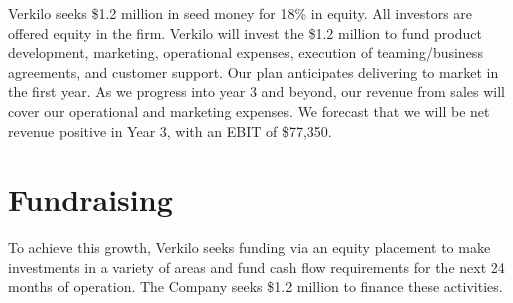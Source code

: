 \documentclass[10pt,openany]{book}
\begin{document}
Verkilo seeks \$1.2 million in seed money for 18\% in equity. All
investors are offered equity in the firm. Verkilo will invest the \$1.2
million to fund product development, marketing, operational expenses,
execution of teaming/business agreements, and customer support. Our plan
anticipates delivering to market in the first year. As we progress into
year 3 and beyond, our revenue from sales will cover our operational and
marketing expenses. We forecast that we will be net revenue positive in
Year 3, with an EBIT of \$77,350.

\hypertarget{fundraising}{%
\section{Fundraising}\label{fundraising}}

To achieve this growth, Verkilo seeks funding via an equity placement to
make investments in a variety of areas and fund cash flow requirements
for the next 24 months of operation. The Company seeks \$1.2 million to
finance these activities.
\end{document}
